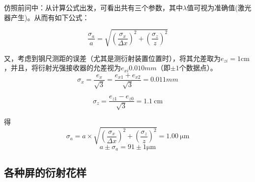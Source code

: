 \documentclass{ctexart}
\begin{document}
仿照前问中：从计算公式出发，可看出共有三个参数，其中$\lambda$值可视为准确值(激光器产生)。从而有如下公式：

$$\frac{\sigma_a}a=\sqrt{(\frac{\sigma_x}{\Delta x})^2+(\frac{\sigma_z}z)^2}$$

又，考虑到钢尺测距的误差（尤其是测衍射装置位置时），将其允差取为$e_{zi}=1\si{\centi\meter} $，并且，将衍射光强接收器的允差视为$e_{xi}0.010\si{mm}$（即$\pm 1$个数据点）。
$$\sigma_x=\frac{e_x}{\sqrt{3}}=\frac{e_{x1}+e_{x2}}{\sqrt{3}}=0.011\si{mm}$$

$$\sigma_z=\frac{e_{z1}-e_{z0}}{\sqrt{3}}=\SI{1.1}{\centi\meter}$$

得$$\sigma_a=a\times\sqrt{(\frac{\sigma_x}{\Delta x})^2+(\frac{\sigma_z}z)^2}=\SI{1.00}{\micro \meter}  $$ 
$$a \pm \sigma_a=91\pm 1 \si{\micro \meter}$$
\subsection{各种屏的衍射花样}
\end{document}
